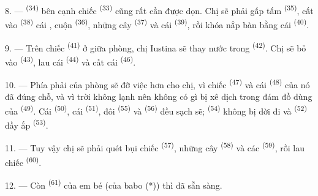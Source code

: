 8. ---  \textsuperscript{(34)} bên cạnh chiếc 
\textsuperscript{(33)} cũng rất cần được dọn. Chị sẽ phải gấp tấm 
\textsuperscript{(35)}, cất vào  \textsuperscript{(38)} cái
, cuộn  \textsuperscript{(36)}, những cây 
\textsuperscript{(37)} và cái  \textsuperscript{(39)}, rồi khóa nắp bàn bằng
cái  \textsuperscript{(40)}.

9. --- Trên chiếc  \textsuperscript{(41)} ở giữa phòng, chị Iustina
sẽ thay nước trong  \textsuperscript{(42)}. Chị sẽ bỏ  vào
 \textsuperscript{(43)}, lau cái 
\textsuperscript{(44)} và cất cái  \textsuperscript{(46)}.

10. --- Phía phải của phòng sẽ đỡ việc hơn cho chị, vì chiếc 
\textsuperscript{(47)} và cái  \textsuperscript{(48)} của nó đã đúng chỗ, và
vì trời không lạnh nên không có gì bị xê dịch trong đám đồ dùng của 
\textsuperscript{(49)}. Cái  \textsuperscript{(50)}, cái 
\textsuperscript{(51)}, đôi  \textsuperscript{(55)} và  \textsuperscript{(56)} đều sạch sẽ; 
\textsuperscript{(54)} không bị dời đi và  \textsuperscript{(52)} đầy
ắp  \textsuperscript{(53)}.



11. --- Tuy vậy chị sẽ phải quét bụi chiếc 
\textsuperscript{(57)}, những cây  \textsuperscript{(58)} và các
 \textsuperscript{(59)}, rồi lau chiếc 
\textsuperscript{(60)}.

12. --- Còn  \textsuperscript{(61)} của em bé (của babo (*)) thì đã sẵn
sàng.

\VUsaut{5.0mm}
\VUsaut{3.0mm}

